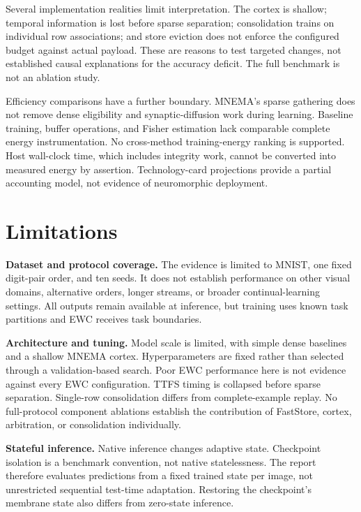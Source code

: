 \documentclass[10pt,a4paper]{article}
\begin{document}
Several implementation realities limit interpretation. The cortex is shallow;
temporal information is lost before sparse separation; consolidation trains on
individual row associations; and store eviction does not enforce the configured
budget against actual payload. These are reasons to test targeted changes,
not established causal explanations for the accuracy deficit. The full
benchmark is not an ablation study.

Efficiency comparisons have a further boundary. MNEMA's sparse gathering does
not remove dense eligibility and synaptic-diffusion work during learning.
Baseline training, buffer operations, and Fisher estimation lack comparable
complete energy instrumentation. No cross-method training-energy ranking is
supported. Host wall-clock time, which includes integrity work, cannot be
converted into measured energy by assertion. Technology-card projections
provide a partial accounting model, not evidence of neuromorphic deployment.

\section{Limitations}
\label{sec:limitations}
\textbf{Dataset and protocol coverage.} The evidence is limited to MNIST,
one fixed digit-pair order, and ten seeds. It does not establish performance
on other visual domains, alternative orders, longer streams, or broader
continual-learning settings. All outputs remain available at inference, but
training uses known task partitions and EWC receives task boundaries.

\textbf{Architecture and tuning.} Model scale is limited, with simple dense
baselines and a shallow MNEMA cortex. Hyperparameters are fixed rather than
selected through a validation-based search. Poor EWC performance here is not
evidence against every EWC configuration. TTFS timing is collapsed before
sparse separation. Single-row consolidation differs from complete-example
replay. No full-protocol component ablations establish the contribution of
FastStore, cortex, arbitration, or consolidation individually.

\textbf{Stateful inference.} Native inference changes adaptive state.
Checkpoint isolation is a benchmark convention, not native statelessness.
The report therefore evaluates predictions from a fixed trained state per
image, not unrestricted sequential test-time adaptation. Restoring the
checkpoint's membrane state also differs from zero-state inference.
\end{document}
